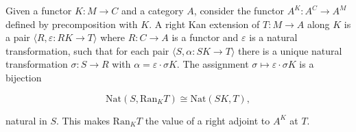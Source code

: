 Given a functor $K: M \to C$ and a category $A$, consider the functor $A^K: A^C \to A^M$ defined by precomposition with $K$. A right Kan extension of $T: M \to A$ along $K$ is a pair $\langle R, \varepsilon: RK \to T \rangle$ where $R: C \to A$ is a functor and $\varepsilon$ is a natural transformation, such that for each pair $\langle S, \alpha: SK \to T \rangle$ there is a unique natural transformation $\sigma: S \to R$ with $\alpha = \varepsilon \cdot \sigma K$. The assignment $\sigma \mapsto \varepsilon \cdot \sigma K$ is a bijection

$$\mathrm{Nat}(S, \mathrm{Ran}_K T) \cong \mathrm{Nat}(SK, T),$$

natural in $S$. This makes $\mathrm{Ran}_K T$ the value of a right adjoint to $A^K$ at $T$.
